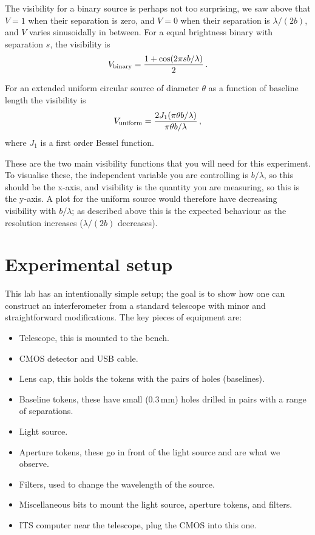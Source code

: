 \documentclass[11pt]{article}
\begin{document}
The visibility for a binary source is perhaps not too surprising, we saw above that $V=1$ when their separation is zero, and $V=0$ when their separation is $\lambda/(2b)$, and $V$ varies sinusoidally in between. For a equal brightness binary with separation $s$, the visibility is
\begin{equation}
    V_{\rm binary} = \frac{1 + \cos ( 2 \pi s b / \lambda )}{2} \, .
\end{equation}

For an extended uniform circular source of diameter $\theta$ as a function of baseline length the visibility is
\begin{equation}
    V_{\rm uniform} = \frac{2 J_1(\pi \theta b / \lambda)}{\pi \theta b / \lambda} \, ,
\end{equation}
where $J_1$ is a first order Bessel function.

These are the two main visibility functions that you will need for this experiment. To visualise these, the independent variable you are controlling is $b/\lambda$, so this should be the x-axis, and visibility is the quantity you are measuring, so this is the y-axis. A plot for the uniform source would therefore have decreasing visibility with $b/\lambda$; as described above this is the expected behaviour as the resolution increases ($\lambda/(2b)$ decreases).

\clearpage
\section{Experimental setup}

This lab has an intentionally simple setup; the goal is to show how one can construct an interferometer from a standard telescope with minor and straightforward modifications. The key pieces of equipment are:
\begin{itemize}
    \item Telescope, this is mounted to the bench.
    \item CMOS detector and USB cable.
    \item Lens cap, this holds the tokens with the pairs of holes (baselines).
    \item Baseline tokens, these have small (0.3\,mm) holes drilled in pairs with a range of separations.
    \item Light source.
    \item Aperture tokens, these go in front of the light source and are what we observe.
    \item Filters, used to change the wavelength of the source.
    \item Miscellaneous bits to mount the light source, aperture tokens, and filters.
    \item ITS computer near the telescope, plug the CMOS into this one.
\end{itemize}
\end{document}
